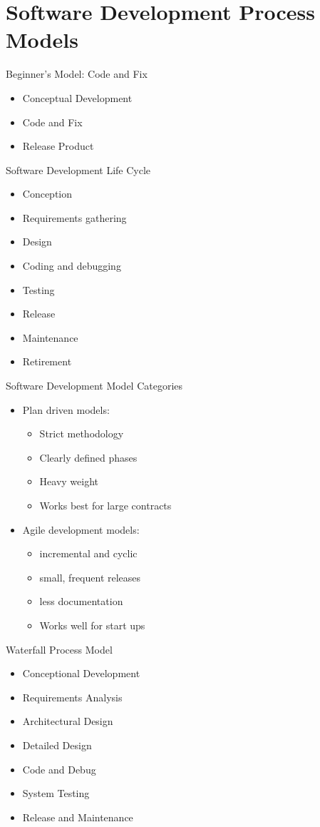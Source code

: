 \documentclass[12pt]{article}
\begin{document}
\section{Software Development Process Models}

Beginner's Model: Code and Fix
\begin{itemize}
    \item Conceptual Development
    \item Code and Fix
    \item Release Product
\end{itemize}

Software Development Life Cycle
\begin{itemize}
    \item Conception
    \item Requirements gathering
    \item Design
    \item Coding and debugging
    \item Testing
    \item Release
    \item Maintenance
    \item Retirement
\end{itemize}

Software Development Model Categories
\begin{itemize}
    \item Plan driven models:
    \begin{itemize}
        \item Strict methodology
        \item Clearly defined phases
        \item Heavy weight
        \item Works best for large contracts
    \end{itemize}
    \item Agile development models:
    \begin{itemize}
        \item incremental and cyclic
        \item small, frequent releases
        \item less documentation
        \item Works well for start ups
    \end{itemize}
\end{itemize}

Waterfall Process Model
\begin{itemize}
    \item Conceptional Development
    \item Requirements Analysis
    \item Architectural Design
    \item Detailed Design
    \item Code and Debug
    \item System Testing 
    \item Release and Maintenance
\end{itemize}
\end{document}
